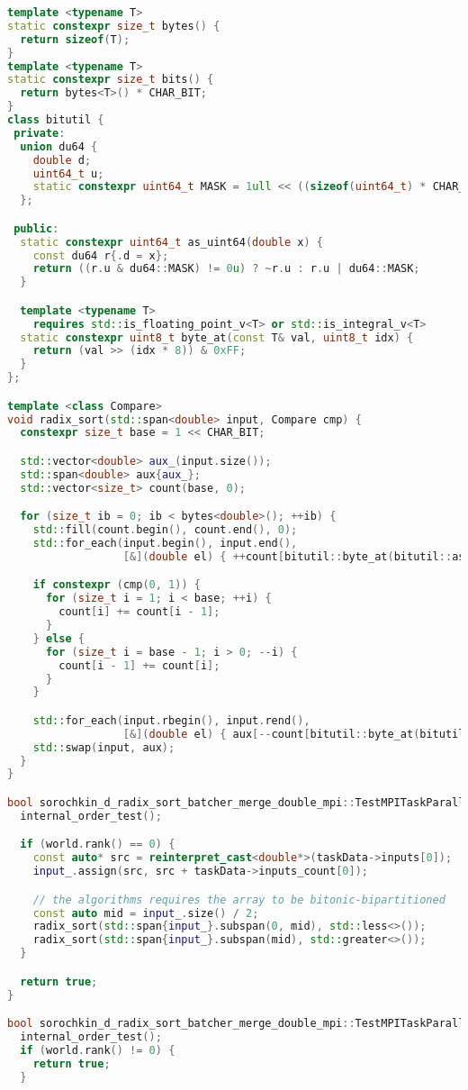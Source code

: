 \documentclass[12pt]{article}
\begin{document}
\begin{lstlisting}[language=C++, caption={Код алгоритма}]
template <typename T>
static constexpr size_t bytes() {
  return sizeof(T);
}
template <typename T>
static constexpr size_t bits() {
  return bytes<T>() * CHAR_BIT;
}
class bitutil {
 private:
  union du64 {
    double d;
    uint64_t u;
    static constexpr uint64_t MASK = 1ull << ((sizeof(uint64_t) * CHAR_BIT) - 1);
  };

 public:
  static constexpr uint64_t as_uint64(double x) {
    const du64 r{.d = x};
    return ((r.u & du64::MASK) != 0u) ? ~r.u : r.u | du64::MASK;
  }

  template <typename T>
    requires std::is_floating_point_v<T> or std::is_integral_v<T>
  static constexpr uint8_t byte_at(const T& val, uint8_t idx) {
    return (val >> (idx * 8)) & 0xFF;
  }
};

template <class Compare>
void radix_sort(std::span<double> input, Compare cmp) {
  constexpr size_t base = 1 << CHAR_BIT;

  std::vector<double> aux_(input.size());
  std::span<double> aux{aux_};
  std::vector<size_t> count(base, 0);

  for (size_t ib = 0; ib < bytes<double>(); ++ib) {
    std::fill(count.begin(), count.end(), 0);
    std::for_each(input.begin(), input.end(),
                  [&](double el) { ++count[bitutil::byte_at(bitutil::as_uint64(el), ib)]; });

    if constexpr (cmp(0, 1)) {
      for (size_t i = 1; i < base; ++i) {
        count[i] += count[i - 1];
      }
    } else {
      for (size_t i = base - 1; i > 0; --i) {
        count[i - 1] += count[i];
      }
    }

    std::for_each(input.rbegin(), input.rend(),
                  [&](double el) { aux[--count[bitutil::byte_at(bitutil::as_uint64(el), ib)]] = el; });
    std::swap(input, aux);
  }
}

bool sorochkin_d_radix_sort_batcher_merge_double_mpi::TestMPITaskParallel::pre_processing() {
  internal_order_test();

  if (world.rank() == 0) {
    const auto* src = reinterpret_cast<double*>(taskData->inputs[0]);
    input_.assign(src, src + taskData->inputs_count[0]);

    // the algorithms requires the array to be bitonic-bipartitioned
    const auto mid = input_.size() / 2;
    radix_sort(std::span{input_}.subspan(0, mid), std::less<>());
    radix_sort(std::span{input_}.subspan(mid), std::greater<>());
  }

  return true;
}

bool sorochkin_d_radix_sort_batcher_merge_double_mpi::TestMPITaskParallel::validation() {
  internal_order_test();
  if (world.rank() != 0) {
    return true;
  }


\end{lstlisting}
\end{document}
